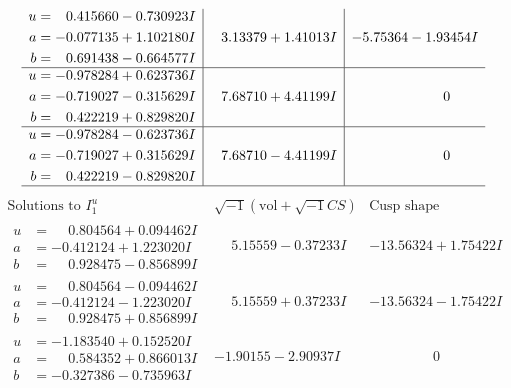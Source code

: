 \documentclass[1p]{elsarticle_modified}
\theoremstyle{definition}
\newcommand{\I}{\sqrt{-1}}
\begin{document}
$$\begin{array}{c|c|c}
\begin{aligned}
u &= \phantom{-}0.415660 - 0.730923 I \\
a &= -0.077135 + 1.102180 I \\
b &= \phantom{-}0.691438 - 0.664577 I\end{aligned}
 & \phantom{-}3.13379 + 1.41013 I & -5.75364 - 1.93454 I \\ \hline\begin{aligned}
u &= -0.978284 + 0.623736 I \\
a &= -0.719027 - 0.315629 I \\
b &= \phantom{-}0.422219 + 0.829820 I\end{aligned}
 & \phantom{-}7.68710 + 4.41199 I & \phantom{-0.000000 } 0 \\ \hline\begin{aligned}
u &= -0.978284 - 0.623736 I \\
a &= -0.719027 + 0.315629 I \\
b &= \phantom{-}0.422219 - 0.829820 I\end{aligned}
 & \phantom{-}7.68710 - 4.41199 I & \phantom{-0.000000 } 0\\
 \hline 
 \end{array}$$\newpage$$\begin{array}{c|c|c}  
\text{Solutions to }I^u_{1}& \I (\text{vol} + \sqrt{-1}CS) & \text{Cusp shape}\\
 \hline 
\begin{aligned}
u &= \phantom{-}0.804564 + 0.094462 I \\
a &= -0.412124 + 1.223020 I \\
b &= \phantom{-}0.928475 - 0.856899 I\end{aligned}
 & \phantom{-}5.15559 - 0.37233 I & -13.56324 + 1.75422 I \\ \hline\begin{aligned}
u &= \phantom{-}0.804564 - 0.094462 I \\
a &= -0.412124 - 1.223020 I \\
b &= \phantom{-}0.928475 + 0.856899 I\end{aligned}
 & \phantom{-}5.15559 + 0.37233 I & -13.56324 - 1.75422 I \\ \hline\begin{aligned}
u &= -1.183540 + 0.152520 I \\
a &= \phantom{-}0.584352 + 0.866013 I \\
b &= -0.327386 - 0.735963 I\end{aligned}
 & -1.90155 - 2.90937 I & \phantom{-0.000000 } 0 \\ \hline\begin{aligned}

\end{aligned}
\end{array}$$
\end{document}
